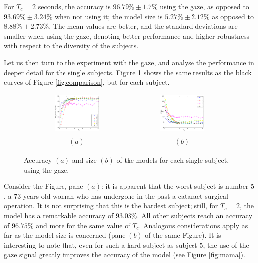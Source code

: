 \documentclass[jou,a4paper,notxfonts]{apa}
\begin{document}
For $T_c=2$ seconds, the accuracy is $96.79\% \pm 1.7\%$ using the
gaze, as opposed to $93.69\% \pm 3.24\%$ when not using it; the model
size is $5.27\% \pm 2.12\%$ as opposed to $8.88\% \pm 2.73\%$. The
mean values are better, and the standard deviations are smaller when
using the gaze, denoting better performance and higher robustness with
respect to the diversity of the subjects.

Let us then turn to the experiment with the gaze, and analyse the
performance in deeper detail for the single subjects. Figure
\ref{fig:subjects} shows the same results as the black curves of Figure
\ref{fig:comparison}, but for each subject.

\begin{figure}[!ht]
  \centering
    \begin{tabular}{cc}
      \includegraphics[width=0.45\textwidth]{figs/subjects_acc.eps} &
      \includegraphics[width=0.45\textwidth]{figs/subjects_size.eps} \\
      $(a)$ & $(b)$
    \end{tabular}
    \caption{Accuracy $(a)$ and size $(b)$ of the models for each single subject,
    using the gaze.}
    \label{fig:subjects}
\end{figure}

Consider the Figure, pane $(a)$: it is apparent that the worst subject
is number $5$, a 73-years old woman who has undergone in
the past a cataract surgical operation. It is not surprising that this
is the hardest subject; still, for $T_c=2$, the model has a remarkable
accuracy of $93.03\%$. All other subjects reach an accuracy of
$96.75\%$ and more for the same value of $T_c$. Analogous
considerations apply as far as the model size is concerned (pane $(b)$
of the same Figure). It is interesting to note that, even for such a
hard subject as subject $5$, the use of the gaze signal greatly
improves the accuracy of the model (see Figure \ref{fig:mama}).
\end{document}

